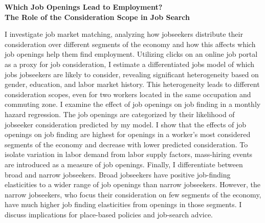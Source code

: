 \documentclass[11pt]{article}
\begin{document}
\vspace{8mm}
\hypertarget{abs:consid}{}%
\begin{center}
{\Large\bfseries Which Job Openings Lead to Employment?\\ The Role of the Consideration Scope in Job Search}
\end{center}

I investigate job market matching, analyzing how jobseekers distribute their consideration over different segments of the economy and how this affects which job openings help them find employment. Utilizing clicks on an online job portal as a proxy for job consideration, I estimate a differentiated jobs model of which jobs jobseekers are likely to consider, revealing significant heterogeneity based on gender, education, and labor market history. This heterogeneity leads to different consideration scopes, even for two workers located in the same occupation and commuting zone. I examine the effect of job openings on job finding in a monthly hazard regression. The job openings are categorized by their likelihood of jobseeker consideration predicted by my model. I show that the effects of job openings on job finding are highest for openings in a worker's most considered segments of the economy and decrease with lower predicted consideration. To isolate variation in labor demand from labor supply factors, mass-hiring events are introduced as a measure of job openings. Finally, I differentiate between broad and narrow jobseekers. Broad jobseekers have positive job-finding elasticities to a wider range of job openings than narrow jobseekers. However, the narrow jobseekers, who focus their consideration on few segments of the economy, have much higher job finding elasticities from openings in those segments. I discuss implications for place-based policies and job-search advice.
\end{document}
